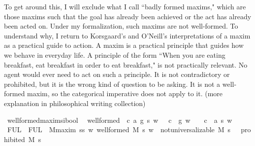 \begin{isabellebody}
\begin{isamarkuptext}
To get around this, I will exclude what I call ``badly formed maxims," which are those maxims such that the goal has already been 
achieved or the act has already been acted on. Under my formalization, such maxims are 
not well-formed. To understand why, I return to Korsgaard's and O'Neill's interpretations of a maxim as a practical
guide to action. A maxim is a practical principle that guides how we behave in everyday life. A 
principle of the form ``When you are eating breakfast, eat breakfast in order to eat breakfast," is not 
practically relevant. No agent would ever need to act on such a principle. It is not contradictory
or prohibited, but it is the wrong kind of question to be asking. It is not a 
well-formed maxim, so the categorical imperative does not apply to it. (more explanation in philosophical 
writing collection)%
\end{isamarkuptext}\isamarkuptrue%
\isamarkupfalse%
\ well{\isacharunderscore}formed{\isacharcolon}{\isacharcolon}{\isachardoublequoteopen}maxim{\isasymRightarrow}s{\isasymRightarrow}i{\isasymRightarrow}bool{\isachardoublequoteclose}\ \ \isanewline
{\isachardoublequoteopen}well{\isacharunderscore}formed\ {\isasymequiv}\ {\isasymlambda}{\isacharparenleft}c{\isacharcomma}\ a{\isacharcomma}\ g{\isacharparenright}{\isachardot}\ {\isasymlambda}s{\isachardot}\ {\isasymlambda}w{\isachardot}\ {\isacharparenleft}{\isasymnot}\ \ {\isacharparenleft}c\ \isactrlbold {\isasymrightarrow}\ g{\isacharparenright}\ w{\isacharparenright}\ {\isasymand}\ {\isacharparenleft}{\isasymnot}\ \ {\isacharparenleft}c\ \isactrlbold {\isasymrightarrow}\ a\ s{\isacharparenright}\ w{\isacharparenright}{\isachardoublequoteclose}\isanewline
%
\isanewline
\isanewline
{}\isamarkupfalse%
\ FUL\ \ {\isachardoublequoteopen}FUL\ {\isasymequiv}\ {\isasymforall}M{\isacharcolon}{\isacharcolon}maxim{\isachardot}\ {\isasymforall}s{\isacharcolon}{\isacharcolon}s{\isachardot}\ {\isacharparenleft}{\isasymforall}w{\isachardot}\ well{\isacharunderscore}formed\ M\ s\ w{\isacharparenright}\ {\isasymlongrightarrow}\ {\isacharparenleft}not{\isacharunderscore}universalizable\ M\ s\ {\isasymlongrightarrow}\ {\isasymTurnstile}\ {\isacharparenleft}prohibited\ M\ s{\isacharparenright}\ {\isacharparenright}{\isachardoublequoteclose}\isanewline
%
\end{isabellebody}
